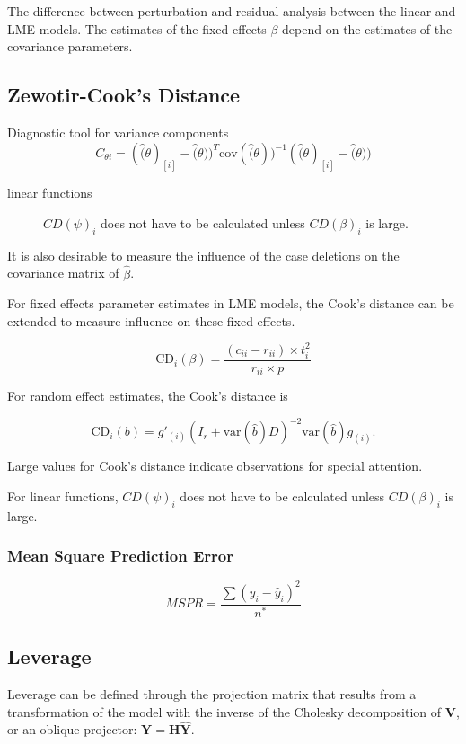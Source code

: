 \documentclass[12pt, a4paper]{report}
\theoremstyle{plain}
\theoremstyle{definition}
\theoremstyle{remark}
\begin{document}
The difference between perturbation and residual analysis between the linear and LME models.
The estimates of the fixed effects $\beta$ depend on the estimates of the covariance parameters.
\subsection{Zewotir-Cook's Distance}

Diagnostic tool for variance components
\[ C_{\theta i} =(\hat(\theta)_{[i]} - \hat(\theta))^{T}\mbox{cov}( \hat(\theta))^{-1}(\hat(\theta)_{[i]} - \hat(\theta))\]

\begin{description}
	\item[linear functions]
	$CD(\psi)_i$ does not have to be calculated unless $CD(\beta)_i$ is large.
\end{description}


It is also desirable to measure the influence of the case deletions on the covariance matrix of $\hat{\beta}$.

For fixed effects parameter estimates in LME models, the  Cook's distance can be extended to measure influence on these fixed effects.

\[
\mbox{CD}_{i}(\beta) = \frac{(c_{ii} - r_{ii}) \times t^2_{i}}{r_{ii} \times p}
\]


For random effect estimates, the  Cook's distance is

\[
\mbox{CD}_{i}(b) = g{\prime}_{(i)} (I_{r} + \mbox{var}(\hat{b})D)^{-2}\mbox{var}(\hat{b})g_{(i)}.
\]

Large values for Cook's distance indicate observations for special attention.


For linear functions, $CD(\psi)_i$ does not have to be calculated unless $CD(\beta)_i$ is large.
\subsubsection{Mean Square Prediction Error}
\begin{equation}
MSPR = \frac{\sum (y_{i}-\hat{y}_{i})^2}{n^*}
\end{equation}

\subsection{Leverage}
Leverage can be defined through the projection matrix that results from a transformation of the model with the inverse of the Cholesky decomposition of $\boldsymbol{V}$, or an oblique projector:	$\boldsymbol{Y} = \boldsymbol{H}\boldsymbol{\hat{Y}}$.
\end{document}

